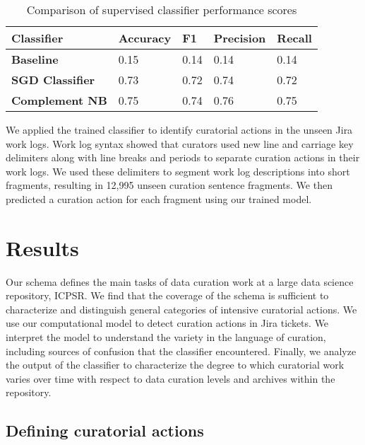 \documentclass[conference]{IEEEtran}
\begin{document}
\begin{table}[t]
\centering
\caption{Comparison of supervised classifier performance scores}
\begin{tabularx}{\columnwidth}{l|X|X|X|X}
\textbf{Classifier} & \textbf{Accuracy} & \textbf{F1} & \textbf{Precision} & \textbf{Recall}     \\
\hline
\textbf{Baseline} & 0.15 & 0.14 & 0.14 & 0.14                         \\
\textbf{SGD Classifier}	& 0.73	& 0.72	& 0.74	& 0.72          \\
\textbf{Complement NB}	& 0.75	& 0.74	& 0.76	& 0.75 
\end{tabularx}
\label{table:metrics}
\end{table}

We applied the trained classifier to identify curatorial actions in the unseen Jira work logs. Work log syntax showed that curators used new line and carriage key delimiters along with line breaks and periods to separate curation actions in their work logs. We used these delimiters to segment work log descriptions into short fragments, resulting in 12,995 unseen curation sentence fragments. We then predicted a curation action for each fragment using our trained model.  

\section{Results}
\label{results}
Our schema defines the main tasks of data curation work at a large data science repository, ICPSR. We find that the coverage of the schema is sufficient to characterize and distinguish general categories of intensive curatorial actions. We use our computational model to detect curation actions in Jira tickets. We interpret the model to understand the variety in the language of curation, including sources of confusion that the classifier encountered. Finally, we analyze the output of the classifier to characterize the degree to which curatorial work varies over time with respect to data curation levels and archives within the repository.

\subsection{Defining curatorial actions}
\label{defining-curatorial-work}
\end{document}
